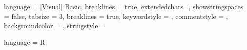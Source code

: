 
\usepackage{listings}


{
	language = {[Visual] Basic},	
	breaklines = true,
	extendedchars=\true,
	showstringspaces = false,	
	tabsize = 3,
	breaklines = true,
	keywordstyle = \color{blue},
	commentstyle = \color{green!35!black},
	backgroundcolor = \color{gray!20!white},
	stringstyle = \color{red}
}


{
	language = R
}


